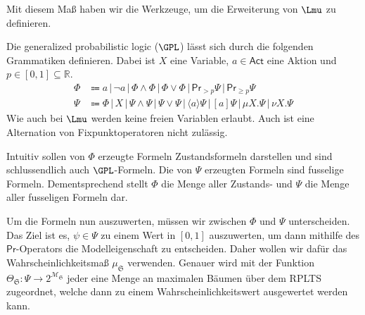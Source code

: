 Mit diesem Maß haben wir die Werkzeuge, um die Erweiterung von $\Lmu$ zu definieren.
\begin{definition}
	Die generalized probabilistic logic ($\GPL$) lässt sich durch die folgenden Grammatiken definieren. Dabei ist $X$ eine Variable, $a\in \mathsf{Act}$ eine Aktion und $p\in [0,1]\subseteq \mathbb{R}$.
	\begin{align*}
		\Phi &\Coloneqq a \,|\, \neg a \,|\, \Phi \land \Phi \,|\, \Phi\lor \Phi\,|\, \mathsf{Pr}_{>p}\Psi \,|\, \mathsf{Pr}_{\geq p}\Psi \\
		\Psi &\Coloneqq \Phi \,|\, X \,|\, \Psi\land\Psi \,|\, \Psi\lor \Psi \,|\, \langle a \rangle\Psi \,|\, [a]\Psi \,|\, \mu X.\Psi \,|\, \nu X.\Psi
	\end{align*}
	Wie auch bei $\Lmu$ werden keine freien Variablen erlaubt.
	Auch ist eine Alternation von Fixpunktoperatoren nicht zulässig.
	
	Intuitiv sollen von $\Phi$ erzeugte Formeln Zustandsformeln darstellen und sind schlussendlich auch $\GPL$-Formeln. Die von $\Psi$ erzeugten Formeln sind fusselige Formeln.
	Dementsprechend stellt $\Phi$ die Menge aller Zustands- und $\Psi$ die Menge aller fusseligen Formeln dar.
\end{definition}

Um die Formeln nun auszuwerten, müssen wir zwischen $\Phi$ und $\Psi$ unterscheiden.
Das Ziel ist es, $\psi\in \Psi$ zu einem Wert in $[0,1]$ auszuwerten, um dann mithilfe des $\mathsf{Pr}$-Operators die Modelleigenschaft zu entscheiden.
Daher wollen wir dafür das Wahrscheinlichkeitsmaß $\mu_\mathfrak{S}$ verwenden.
Genauer wird mit der Funktion $\Theta_\mathfrak{S}:\Psi \to 2^{\mathcal{M}_\mathfrak{S}}$ jeder \fuzzy eine Menge an maximalen Bäumen über dem RPLTS zugeordnet, welche dann zu einem Wahrscheinlichkeitswert ausgewertet werden kann. \cite{cleaveland2005probabilistic}

